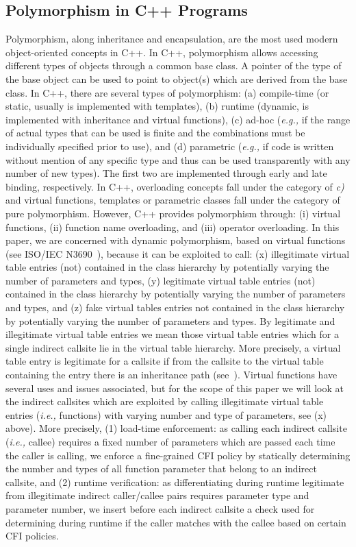 \subsection{Polymorphism in C++ Programs}
\label{Polymorphism in C++}
Polymorphism, along inheritance and encapsulation, are the most used modern object-oriented concepts in C++. In C++, polymorphism allows accessing different types of objects 
through a common base class. A pointer of the type of the base object can be used to point to object(s) which are derived from the base class. In C++, there are 
several types of polymorphism:
(a) compile-time (or static, usually is implemented with templates), 
(b) runtime (dynamic, is implemented with inheritance and virtual functions), 
(c) ad-hoc (\textit{e.g.,} if the range of actual types that can be used is finite and the combinations must be individually specified prior to use), and
(d) parametric (\textit{e.g.,} if code is written without mention of any specific type and thus can be used transparently with any number of new types). 
The first two are implemented through early and late binding, respectively. In C++, overloading concepts fall under the category of \textit{c)} and virtual functions, 
templates or parametric classes fall under the category of pure polymorphism. However, C++ provides polymorphism through: 
(i) virtual functions,
(ii) function name overloading, and 
(iii) operator overloading. 
In this paper, we are concerned with dynamic polymorphism, based on virtual functions (see ISO/IEC N3690~\cite{iso:iecN3690}), because it can be exploited to call: 
(x) illegitimate virtual table entries (not) contained in the class hierarchy by potentially varying the number of parameters and types,
(y) legitimate virtual table entries (not) contained in the class hierarchy by potentially varying the number of parameters and types, and 
(z) fake virtual tables entries not contained in the class hierarchy by potentially varying the number of parameters and types.
By legitimate and illegitimate virtual table entries we mean those virtual table entries which for a single indirect callsite lie in the virtual table hierarchy. More 
precisely, a virtual table entry is legitimate for a callsite if from the callsite to the virtual table containing the entry there is an inheritance path (see~\cite{haller:shrinkwrap}). 
Virtual functions have several uses and issues associated, but for the scope of this paper we will look at the indirect callsites which are exploited by calling illegitimate virtual 
table entries (\textit{i.e.,} functions) with varying number and type of parameters, see (x) above). More precisely, 
(1) load-time enforcement: as calling each indirect callsite (\textit{i.e.,} callee) requires a fixed number of parameters which are passed each time the caller is calling, 
we enforce a fine-grained CFI policy by statically determining the number and types of all function parameter that belong to an indirect callsite, and
(2) runtime verification: as differentiating during runtime legitimate from illegitimate indirect caller/callee pairs requires parameter type and parameter number, we 
insert before each indirect callsite a check used for determining during runtime if the caller matches with the callee based on certain CFI policies.


